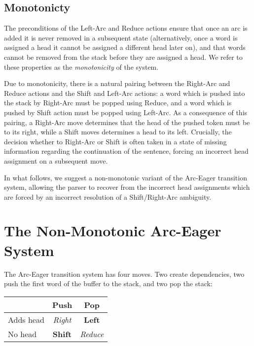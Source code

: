\documentclass[11pt,letterpaper]{article}
\begin{document}
\subsection{Monotonicty}

The preconditions of the Left-Arc and Reduce actions ensure that once an
arc is added it is never removed in a subsequent state (alternatively,
once a word is assigned a head it cannot be assigned a different head
later on), and that words cannot be removed from the stack before they
are assigned a head. We refer to these properties as the
\textit{monotonicity} of the system.

Due to monotonicity, there is a natural pairing between the Right-Arc and
Reduce actions and the Shift and Left-Arc actions: a word which is pushed
into the stack by Right-Arc must be popped using Reduce,
 and a word which is pushed by Shift action must be popped
using Left-Arc.
As a consequence of this pairing, a Right-Arc move determines that the head of
the pushed token must be to its right, while a Shift moves determines a head
to its left. Crucially, the decision whether to Right-Arc or Shift is often taken
in a state of missing information regarding the continuation of the sentence,
forcing an incorrect head assignment on a subsequent move. 


In what follows, we suggest a non-monotonic variant of the Arc-Eager transition
system, allowing the parser to recover from the incorrect head assignments
which are forced by an incorrect resolution of a Shift/Right-Arc ambiguity.

\section{The Non-Monotonic Arc-Eager System}

The Arc-Eager transition system \citep{nivre:04} has four moves. Two create 
dependencies, two push the first word of the buffer to the stack, and two pop 
the stack:

\begin{center}
    \begin{tabular}{l|cc}
             & Push  & Pop    \\
           \hline
           Adds head   & \emph{Right} & \textbf{Left}    \\
            No head    & \textbf{Shift} & \emph{Reduce}   \\
     \end{tabular}
\end{center}
\end{document}
